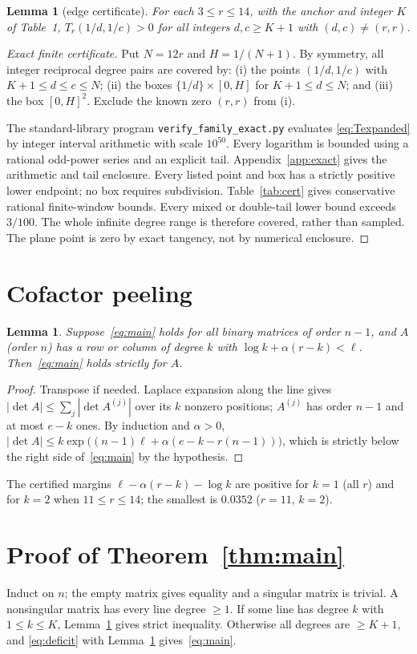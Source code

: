 \documentclass[11pt]{article}
\newtheorem{lemma}[theorem]{Lemma}
\theoremstyle{remark}
\begin{document}
\begin{lemma}[edge certificate]\label{lem:edge}
For each $3\le r\le 14$, with the anchor and integer $K$ of Table~1, $T_r(1/d,1/c)>0$ for all integers
$d,c\ge K+1$ with $(d,c)\neq(r,r)$.
\end{lemma}
\begin{proof}[Exact finite certificate]
Put $N=12r$ and $H=1/(N+1)$. By symmetry, all integer reciprocal degree pairs
are covered by: (i) the points $(1/d,1/c)$ with $K+1\le d\le c\le N$;
(ii) the boxes $\{1/d\}\times[0,H]$ for $K+1\le d\le N$; and (iii) the box
$[0,H]^2$. Exclude the known zero $(r,r)$ from (i).

The standard-library program \texttt{verify\_family\_exact.py} evaluates
\eqref{eq:Texpanded} by integer interval arithmetic with scale $10^{50}$.
Every logarithm is bounded using a rational odd-power series and an explicit
tail. Appendix~\ref{app:exact} gives the arithmetic and tail enclosure.
Every listed point and box has a strictly positive lower endpoint; no box
requires subdivision. Table~\ref{tab:cert} gives conservative rational
finite-window bounds. Every mixed or double-tail lower bound exceeds $3/100$.
The whole infinite degree range is therefore covered, rather than sampled.
The plane point is zero by exact tangency, not by numerical enclosure.
\end{proof}

\section{Cofactor peeling}
\begin{lemma}\label{lem:peel}
Suppose~\eqref{eq:main} holds for all binary matrices of order $n-1$, and $A$ (order $n$) has a row or column
of degree $k$ with $\log k+\alpha(r-k)<\ell$. Then~\eqref{eq:main} holds strictly for $A$.
\end{lemma}
\begin{proof}
Transpose if needed. Laplace expansion along the line gives $|\det A|\le\sum_{j}|\det A^{(j)}|$ over its $k$
nonzero positions; $A^{(j)}$ has order $n-1$ and at most $e-k$ ones. By induction and $\alpha>0$,
$|\det A|\le k\exp\bigl((n-1)\ell+\alpha(e-k-r(n-1))\bigr)$, which is strictly below the right side
of~\eqref{eq:main} by the hypothesis.
\end{proof}
The certified margins $\ell-\alpha(r-k)-\log k$ are positive for $k=1$ (all $r$) and for $k=2$ when
$11\le r\le14$; the smallest is $0.0352$ ($r=11$, $k=2$).

\section{Proof of Theorem~\ref{thm:main}}
Induct on $n$; the empty matrix gives equality and a singular matrix is trivial. A nonsingular matrix has
every line degree $\ge1$. If some line has degree $k$ with $1\le k\le K$, Lemma~\ref{lem:peel} gives strict
inequality. Otherwise all degrees are $\ge K+1$, and
\eqref{eq:deficit} with Lemma~\ref{lem:edge} gives~\eqref{eq:main}.
\end{document}
